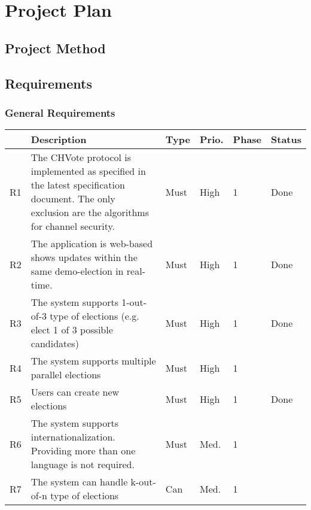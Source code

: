 \newcommand\tabularhead[1]{
\begin{table}[h]
  \caption{Use Case <<#1>>}
  \begin{tabular}{|p{0.3\linewidth}|p{0.7\linewidth}|}
    \hline
    \textbf{Use Case} & \textbf{#1} \\
    \hline}

  \newcommand\addrow[2]{#1 &#2\\ \hline}

  \newcommand\addmulrow[2]{ \begin{minipage}[t][][t]{2.5cm}#1\end{minipage}%
     &\begin{minipage}[t][][t]{8cm}
      \begin{enumerate} #2   \end{enumerate}
      \end{minipage}\\ }

  \newenvironment{usecase}{\tabularhead}
{\hline\end{tabular}\end{table}}

\chapter{Project Plan}
\section{Project Method}
\section{Requirements}
\subsection{General Requirements}
\begin{longtable}{p{0.5cm}p{9cm}p{1cm}p{1cm}p{1cm}p{1cm}}
\hline
 & Description & Type & Prio. & Phase & Status\\
\hline
R1 & The CHVote protocol is implemented as specified in the latest specification document. The only exclusion are the algorithms for channel security. & Must & High & 1 & Done\\
R2 & The application is web-based shows updates within the same demo-election in real-time. & Must & High & 1 & Done\\
R3 & The system supports 1-out-of-3 type of elections (e.g. elect 1 of 3 possible candidates) & Must & High & 1 & Done\\
R4 & The system supports multiple parallel elections & Must & High & 1 & \\
R5 & Users can create new elections & Must & High & 1 & Done \\
R6 & The system supports internationalization. Providing more than one language is not required. & Must & Med. & 1 & \\
R7 & The system can handle k-out-of-n type of elections & Can & Med. & 1 & \\
\end{longtable}


